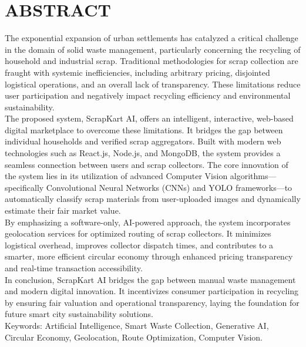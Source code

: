 \chapter*{ABSTRACT}
\thispagestyle{empty}

\vspace{1cm}

The exponential expansion of urban settlements has catalyzed a critical challenge in the domain of solid waste management, particularly concerning the recycling of household and industrial scrap. Traditional methodologies for scrap collection are fraught with systemic inefficiencies, including arbitrary pricing, disjointed logistical operations, and an overall lack of transparency. These limitations reduce user participation and negatively impact recycling efficiency and environmental sustainability.\\

\noindent The proposed system, ScrapKart AI, offers an intelligent, interactive, web-based digital marketplace to overcome these limitations. It bridges the gap between individual households and verified scrap aggregators. Built with modern web technologies such as React.js, Node.js, and MongoDB, the system provides a seamless connection between users and scrap collectors. The core innovation of the system lies in its utilization of advanced Computer Vision algorithms—specifically Convolutional Neural Networks (CNNs) and YOLO frameworks—to automatically classify scrap materials from user-uploaded images and dynamically estimate their fair market value.\\

\noindent By emphasizing a software-only, AI-powered approach, the system incorporates geolocation services for optimized routing of scrap collectors. It minimizes logistical overhead, improves collector dispatch times, and contributes to a smarter, more efficient circular economy through enhanced pricing transparency and real-time transaction accessibility.\\

\noindent In conclusion, ScrapKart AI bridges the gap between manual waste management and modern digital innovation. It incentivizes consumer participation in recycling by ensuring fair valuation and operational transparency, laying the foundation for future smart city sustainability solutions.\\

\noindent Keywords: Artificial Intelligence, Smart Waste Collection, Generative AI, Circular Economy, Geolocation, Route Optimization, Computer Vision.


